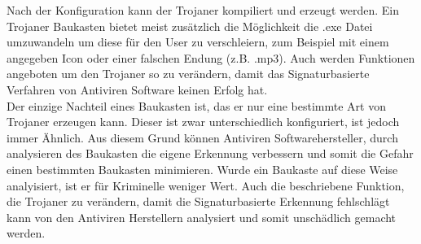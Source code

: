 Nach der Konfiguration kann der Trojaner kompiliert und erzeugt werden. Ein Trojaner Baukasten bietet meist zusätzlich die Möglichkeit die .exe Datei umzuwandeln um diese für den User zu verschleiern, zum Beispiel mit einem angegeben Icon oder einer falschen Endung (z.B. .mp3). Auch werden Funktionen angeboten um den Trojaner so zu verändern, damit das Signaturbasierte Verfahren von Antiviren Software keinen Erfolg hat.\\
Der einzige Nachteil eines Baukasten ist, das er nur eine bestimmte Art von Trojaner erzeugen kann. Dieser ist zwar unterschiedlich konfiguriert, ist jedoch immer Ähnlich. Aus diesem Grund können Antiviren Softwarehersteller, durch analysieren des Baukasten die eigene Erkennung verbessern und somit die Gefahr einen bestimmten Baukasten minimieren. Wurde ein Baukaste auf diese Weise analyisiert, ist er für Kriminelle weniger Wert. Auch die beschriebene Funktion, die Trojaner zu verändern, damit die Signaturbasierte Erkennung fehlschlägt kann von den Antiviren Herstellern analysiert und somit unschädlich gemacht werden\cite{FOCUS}.
